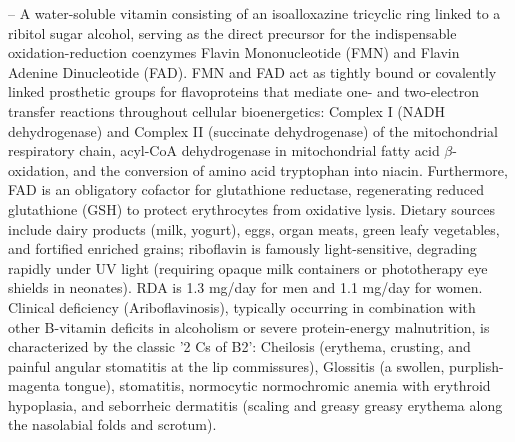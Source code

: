 -- A water-soluble vitamin consisting of an isoalloxazine tricyclic ring linked to a ribitol sugar alcohol, serving as the direct precursor for the indispensable oxidation-reduction coenzymes Flavin Mononucleotide (FMN) and Flavin Adenine Dinucleotide (FAD). FMN and FAD act as tightly bound or covalently linked prosthetic groups for flavoproteins that mediate one- and two-electron transfer reactions throughout cellular bioenergetics: Complex I (NADH dehydrogenase) and Complex II (succinate dehydrogenase) of the mitochondrial respiratory chain, acyl-CoA dehydrogenase in mitochondrial fatty acid $\beta$-oxidation, and the conversion of amino acid tryptophan into niacin. Furthermore, FAD is an obligatory cofactor for glutathione reductase, regenerating reduced glutathione (GSH) to protect erythrocytes from oxidative lysis. Dietary sources include dairy products (milk, yogurt), eggs, organ meats, green leafy vegetables, and fortified enriched grains; riboflavin is famously light-sensitive, degrading rapidly under UV light (requiring opaque milk containers or phototherapy eye shields in neonates). RDA is 1.3 mg/day for men and 1.1 mg/day for women. Clinical deficiency (Ariboflavinosis), typically occurring in combination with other B-vitamin deficits in alcoholism or severe protein-energy malnutrition, is characterized by the classic '2 Cs of B2': Cheilosis (erythema, crusting, and painful angular stomatitis at the lip commissures), Glossitis (a swollen, purplish-magenta tongue), stomatitis, normocytic normochromic anemia with erythroid hypoplasia, and seborrheic dermatitis (scaling and greasy greasy erythema along the nasolabial folds and scrotum).

